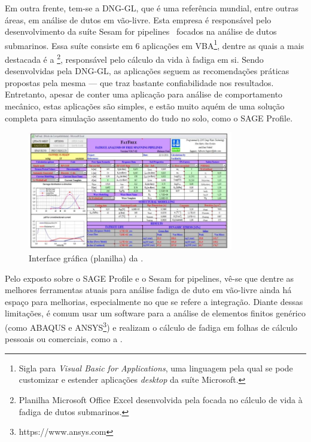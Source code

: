 

Em outra frente, tem-se a DNG-GL, que é uma referência mundial, entre outras áreas, em análise de dutos em vão-livre. Esta empresa é responsável pelo desenvolvimento da suíte Sesam for pipelines~\cite{dnvsesam} focados na análise de dutos submarinos.
Essa suíte consiste em 6 aplicações em VBA\footnote{Sigla para \textit{Visual Basic for Applications}, uma linguagem pela qual se pode customizar e estender aplicações \textit{desktop} da suíte Microsoft.}, dentre as quais a mais destacada é a \fatfree\footnote{Planilha Microsoft Office Excel desenvolvida pela  focada no cálculo de vida à fadiga de dutos submarinos.}, responsável pelo cálculo da vida à fadiga em si. Sendo desenvolvidas pela DNG-GL, as aplicações seguem as recomendações práticas propostas pela mesma --- que traz bastante confiabilidade nos resultados. Entretanto, apesar de conter uma aplicação para análise de comportamento mecânico, estas aplicações são simples, e estão muito aquém de uma solução completa para simulação assentamento do tudo no solo, como o SAGE Profile.

\begin{figure}[!ht]
    \centering
    \caption{Interface gráfica (planilha) da \fatfree.}\label{fig:fatfree}
    \includegraphics[width=0.8\textwidth]{imagens/fatfree}
\end{figure}

Pelo exposto sobre o SAGE Profile e o Sesam for pipelines, vê-se que dentre as melhores ferramentas atuais para análise fadiga de duto em vão-livre ainda há espaço para melhorias, especialmente no que se refere a integração. Diante dessas limitações, é comum usar um software para a análise de elementos finitos genérico (como ABAQUS e ANSYS\footnote{https://www.ansys.com}) e realizam o cálculo de fadiga em folhas de cálculo pessoais ou comerciais, como a \fatfree.

